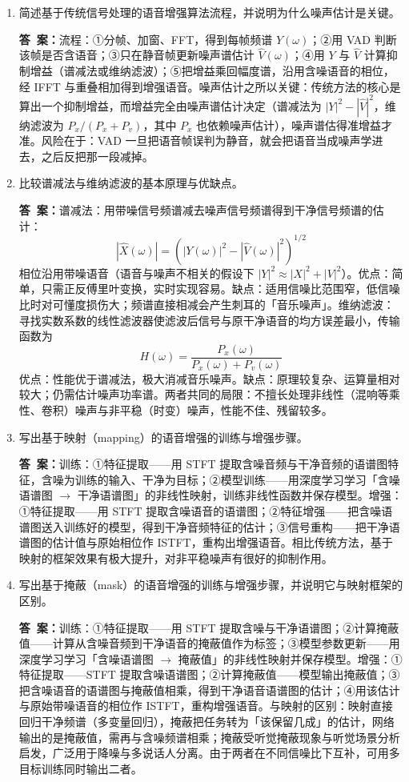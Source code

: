 \documentclass[10.5pt]{ctexart}
\newenvironment{qlist}
  {\begin{enumerate}[label={\sffamily\bfseries\color{accent}\arabic*.},leftmargin=2.4em,labelsep=0.55em,itemsep=0.62em,topsep=0.15em,parsep=0.3em,partopsep=0pt]}
  {\end{enumerate}}
\newcommand{\anslabel}{{\sffamily\bfseries\color{accent}答\ 案：}\hspace{0.35em}}
\newcommand{\ansL}[1]{\par\vspace{3.6\baselineskip}\begin{ansbox}\anslabel #1\end{ansbox}}
\begin{document}
\begin{qlist}

\item 简述基于传统信号处理的语音增强算法流程，并说明为什么噪声估计是关键。
\ansL{流程：①分帧、加窗、FFT，得到每帧频谱 $Y(\omega)$；②用 VAD 判断该帧是否含语音；③只在静音帧更新噪声谱估计 $\hat V(\omega)$；④用 $Y$ 与 $\hat V$ 计算抑制增益（谱减法或维纳滤波）；⑤把增益乘回幅度谱，沿用含噪语音的相位，经 IFFT 与重叠相加得到增强语音。噪声估计之所以关键：传统方法的核心是算出一个抑制增益，而增益完全由噪声谱估计决定（谱减法为 $|Y|^2-|\hat V|^2$，维纳滤波为 $P_x/(P_x+P_v)$，其中 $P_x$ 也依赖噪声估计），噪声谱估得准增益才准。风险在于：VAD 一旦把语音帧误判为静音，就会把语音当成噪声学进去，之后反把那一段减掉。}

\item 比较谱减法与维纳滤波的基本原理与优缺点。
\ansL{谱减法：用带噪信号频谱减去噪声信号频谱得到干净信号频谱的估计：
\[|\hat X(\omega)|=\left(|Y(\omega)|^2-|\hat V(\omega)|^2\right)^{1/2}\]
相位沿用带噪语音（语音与噪声不相关的假设下 $|Y|^2\approx|X|^2+|V|^2$）。优点：简单，只需正反傅里叶变换，实时实现容易。缺点：适用信噪比范围窄，低信噪比时对可懂度损伤大；频谱直接相减会产生刺耳的「音乐噪声」。维纳滤波：寻找实数系数的线性滤波器使滤波后信号与原干净语音的均方误差最小，传输函数为
\[H(\omega)=\frac{P_x(\omega)}{P_x(\omega)+P_v(\omega)}\]
优点：性能优于谱减法，极大消减音乐噪声。缺点：原理较复杂、运算量相对较大；仍需估计噪声功率谱。两者共同的局限：不擅长处理非线性（混响等乘性、卷积）噪声与非平稳（时变）噪声，性能不佳、残留较多。}

\item 写出基于映射（mapping）的语音增强的训练与增强步骤。
\ansL{训练：①特征提取——用 STFT 提取含噪音频与干净音频的语谱图特征，含噪为训练的输入、干净为目标；②模型训练——用深度学习学习「含噪语谱图 $\to$ 干净语谱图」的非线性映射，训练非线性函数并保存模型。增强：①特征提取——用 STFT 提取含噪语音的语谱图；②特征增强——把含噪语谱图送入训练好的模型，得到干净音频特征的估计；③信号重构——把干净语谱图的估计值与原始相位作 ISTFT，重构出增强语音。相比传统方法，基于映射的框架效果有极大提升，对非平稳噪声有很好的抑制作用。}

\item 写出基于掩蔽（mask）的语音增强的训练与增强步骤，并说明它与映射框架的区别。
\ansL{训练：①特征提取——用 STFT 提取含噪与干净语谱图；②计算掩蔽值——计算从含噪音频到干净语音的掩蔽值作为标签；③模型参数更新——用深度学习学习「含噪语谱图 $\to$ 掩蔽值」的非线性映射并保存模型。增强：①特征提取——STFT 提取含噪语谱图；②计算掩蔽值——模型输出掩蔽值；③把含噪语音的语谱图与掩蔽值相乘，得到干净语音语谱图的估计；④用该估计与原始带噪语音的相位作 ISTFT，重构增强语音。与映射的区别：映射直接回归干净频谱（多变量回归），掩蔽把任务转为「该保留几成」的估计，网络输出的是掩蔽值，需再与含噪频谱相乘；掩蔽受听觉掩蔽现象与听觉场景分析启发，广泛用于降噪与多说话人分离。由于两者在不同信噪比下互补，可用多目标训练同时输出二者。}


\end{qlist}
\end{document}
